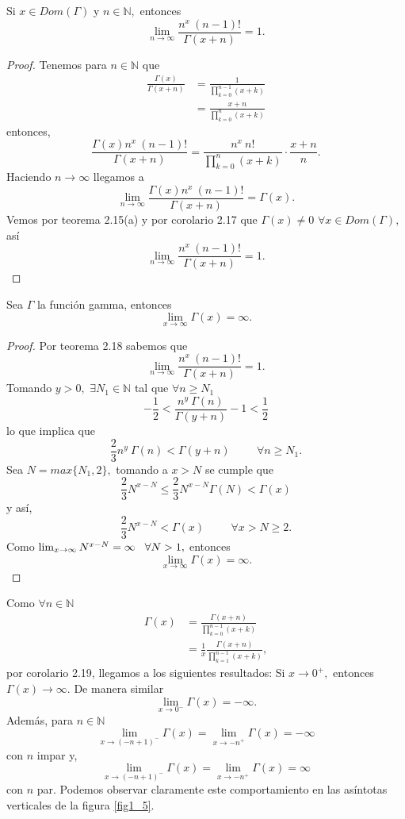 \begin{theorem}
	Si $x \in Dom(\Gamma)$ y $n \in \mathbb{N},$ entonces $$\lim_{n \rightarrow \infty}\frac{n^x\ (n-1)!}{\Gamma(x+n)} = 1.$$
\end{theorem}
\begin{proof}
	Tenemos para $n \in \mathbb{N}$ que 
	\begin{align*}
	\frac{\Gamma(x)}{\Gamma(x+n)} &= \frac{1}{\prod_{k = 0}^{n-1}(x+k)}\\
	&= \frac{x+n}{\prod_{k = 0}^{n}(x+k)}
	\end{align*}
	entonces, $$\frac{\Gamma(x)n^x\ (n-1)!}{\Gamma(x+n)} = \frac{n^x\ n!}{\prod_{k = 0}^{n}(x+k)}\cdot \frac{x+n}{n}.$$
	Haciendo $n \rightarrow \infty$ llegamos a $$\lim_{n \rightarrow \infty}\frac{\Gamma(x)n^x\ (n-1)!}{\Gamma(x+n)} = \Gamma(x).$$
	Vemos por teorema 2.15(a) y por corolario 2.17 que $\Gamma(x) \neq 0$ $\forall x \in Dom(\Gamma),$ así $$\lim_{n \rightarrow \infty}\frac{n^x\ (n-1)!}{\Gamma(x+n)} = 1.$$
\end{proof}
\begin{corollary}
	Sea $\Gamma$ la función gamma, entonces $$\lim_{x \rightarrow \infty}\Gamma(x) = \infty.$$
\end{corollary}
\begin{proof}
	Por teorema 2.18 sabemos que $$\lim_{n \rightarrow \infty}\frac{n^x\ (n-1)!}{\Gamma(x+n)} = 1.$$ Tomando $y > 0,$ $\exists N_1 \in \mathbb{N}$ tal que $\forall n \geq N_1$ $$-\frac{1}{2} < \frac{n^y\ \Gamma(n)}{\Gamma(y+n)}-1 < \frac{1}{2}$$ lo que implica que $$\frac{2}{3}n^y\ \Gamma(n) < \Gamma(y+n)\hspace{1cm}\forall n \geq N_1.$$
	Sea $N = max\{N_1,2\},$ tomando a $x > N$ se cumple que $$\frac{2}{3}N^{x-N} \leq \frac{2}{3}N^{x-N}\Gamma(N) < \Gamma(x)$$ y así, $$\frac{2}{3}N^{x-N} < \Gamma(x)\hspace{1cm}\forall x > N \geq 2.$$
	Como $\lim_{x \rightarrow \infty}N^{x-N} = \infty\hspace{0.3cm}\forall N > 1,$ entonces $$\lim_{x \rightarrow \infty}\Gamma(x) = \infty.$$
\end{proof}
Como $\forall n \in \mathbb{N}$
\begin{align*}
\Gamma(x) &= \frac{\Gamma(x+n)}{\prod_{k = 0}^{n-1}(x+k)}\\
&= \frac{1}{x}\frac{\Gamma(x+n)}{\prod_{k = 1}^{n-1}(x+k)},
\end{align*}
por corolario 2.19, llegamos a los siguientes resultados: 
Si $x \rightarrow 0^+,$ entonces $\Gamma(x) \rightarrow \infty.$ De manera similar $$\lim_{x \rightarrow 0^-}\Gamma(x) = -\infty.$$
Además, para $n \in \mathbb{N}$ $$\lim_{x \rightarrow (-n+1)^-}\Gamma(x) = \lim_{x \rightarrow -n^+}\Gamma(x) = -\infty$$ con $n$ impar y, $$\lim_{x \rightarrow (-n+1)^-}\Gamma(x) = \lim_{x \rightarrow -n^+}\Gamma(x) = \infty$$ con $n$ par. Podemos observar claramente este comportamiento en las asíntotas verticales de la figura \ref{fig1_5}.

